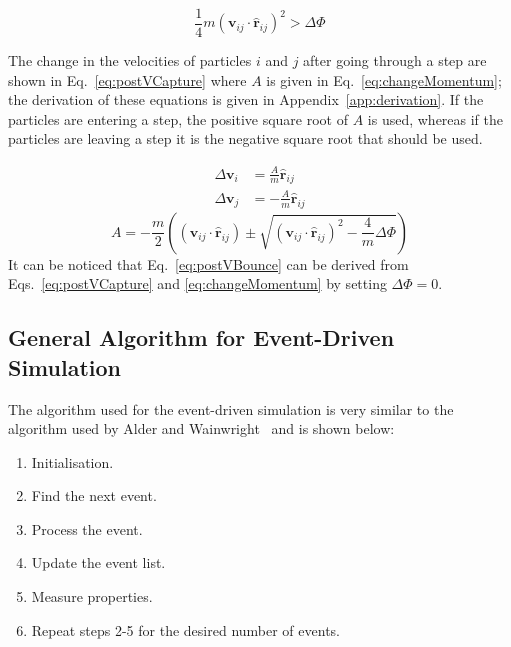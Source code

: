 \documentclass[12pt]{UoAthesis} \usepackage{booktabs}
\begin{document}
\begin{equation}
\label{eq:kineticCost}
  \frac{1}{4}m(\mathbf{v}_{ij}\cdot\mathbf{\hat{r}}_{ij})^2 > \Delta \Phi
\end{equation}

The change in the velocities of particles $i$ and $j$ after going
through a step are shown in Eq.~\eqref{eq:postVCapture} where $A$ is
given in Eq.~\eqref{eq:changeMomentum}; the derivation of these
equations is given in Appendix~\ref{app:derivation}.  If the particles
are entering a step, the positive square root of $A$ is used, whereas
if the particles are leaving a step it is the negative square root
that should be used.

\begin{subequations}
  \label{eq:postVCapture}
  \begin{align}
    \Delta\mathbf{v}_i &= \frac{A}{m} \mathbf{\hat{r}}_{ij} \\
    \Delta\mathbf{v}_j &= -\frac{A}{m}\mathbf{\hat{r}}_{ij}
 \end{align}
\end{subequations}
\begin{equation}
  A = -\frac{m}{2}\left((\mathbf{v}_{ij}\cdot\mathbf{\hat{r}}_{ij}) \pm
    \sqrt{(\mathbf{v}_{ij}\cdot\mathbf{\hat{r}}_{ij})^2 - \frac{4}{m}\Delta \Phi}\right)
  \label{eq:changeMomentum}
\end{equation}
It can be noticed that Eq.~\eqref{eq:postVBounce} can be derived from
Eqs.~\eqref{eq:postVCapture} and \eqref{eq:changeMomentum} by setting
$\Delta \Phi=0$.
\subsection{General Algorithm for Event-Driven Simulation}

The algorithm used for the event-driven simulation is very similar to
the algorithm used by Alder and Wainwright~\cite{Alder1959} and is
shown below:

\begin{enumerate} 
\item Initialisation.
\item Find the next event.
\item Process the event.
\item Update the event list.
\item Measure properties.
\item Repeat steps 2-5 for the desired number of events.
\end{enumerate} 
\end{document}
